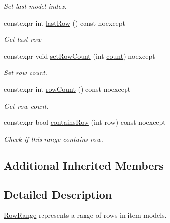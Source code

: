 \begin{DoxyCompactItemize}
\begin{DoxyCompactList}\small\item\em Set last model index. \end{DoxyCompactList}\item 
constexpr int \hyperlink{class_mdt_1_1_item_model_1_1_row_range_a8f233096ed5e6fbd8d87369e85c6c9ca}{last\+Row} () const noexcept
\begin{DoxyCompactList}\small\item\em Get last row. \end{DoxyCompactList}\item 
constexpr void \hyperlink{class_mdt_1_1_item_model_1_1_row_range_a17f134b106027e91f34fef98652ff4b2}{set\+Row\+Count} (int \hyperlink{class_mdt_1_1_item_model_1_1_range_a5677e5e280f1153607c4d30d3816b5f2}{count}) noexcept
\begin{DoxyCompactList}\small\item\em Set row count. \end{DoxyCompactList}\item 
constexpr int \hyperlink{class_mdt_1_1_item_model_1_1_row_range_aec08c58f87b4c5f9a802aece54614121}{row\+Count} () const noexcept
\begin{DoxyCompactList}\small\item\em Get row count. \end{DoxyCompactList}\item 
constexpr bool \hyperlink{class_mdt_1_1_item_model_1_1_row_range_a828962cb93fea0e882ff5f818c2d81d2}{contains\+Row} (int row) const noexcept\hypertarget{class_mdt_1_1_item_model_1_1_row_range_a828962cb93fea0e882ff5f818c2d81d2}{}\label{class_mdt_1_1_item_model_1_1_row_range_a828962cb93fea0e882ff5f818c2d81d2}

\begin{DoxyCompactList}\small\item\em Check if this range contains row. \end{DoxyCompactList}\end{DoxyCompactItemize}
\subsection*{Additional Inherited Members}


\subsection{Detailed Description}
\hyperlink{class_mdt_1_1_item_model_1_1_row_range}{Row\+Range} represents a range of rows in item models. 

